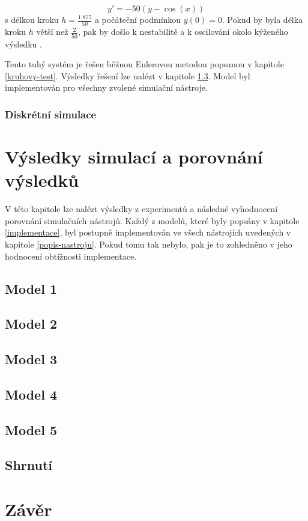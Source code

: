 \begin{equation}
    y' = -50(y - \cos{(x)})
\end{equation}
s délkou kroku $h = \frac{1.875}{50}$ a počáteční podmínkou $y(0) = 0$. Pokud by byla délka kroku $h$ větší než $\frac{2}{50}$, pak by došlo k nestabilitě a k oscilování okolo kýženého výsledku \cite{hairer}.


Tento tuhý systém je řešen běžnou Eulerovou metodou popsanou v kapitole \ref{kruhovy-test}. Výsledky řešení lze nalézt v kapitole \ref{srovnani-tuhy}. Model byl implementován pro všechny zvolené simulační nástroje.

\subsection{Diskrétní simulace}

\chapter{Výsledky simulací a porovnání výsledků}
\label{kapitola5}
V této kapitole lze nalézt výsledky z experimentů a následné vyhodnocení porovnání simulačních nástrojů. Každý z modelů, které byly popsány v kapitole \ref{implementace}, byl postupně implementován ve všech nástrojích uvedených v kapitole \ref{popis-nastroju}. Pokud tomu tak nebylo, pak je to zohledněno v jeho hodnocení obtížnosti implementace.

\section{Model 1}
\label{srovnani-micek}

\section{Model 2}
\label{srovnani-kruh}

\section{Model 3}
\label{srovnani-tuhy}

\section{Model 4}

\section{Model 5}

\section{Shrnutí}




\chapter{Závěr}
\label{kapitola6}


